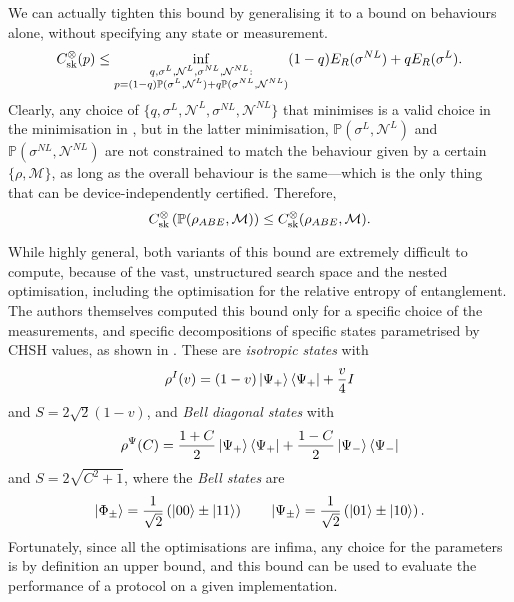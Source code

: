\documentclass[10pt, a4paper]{article}
\numberwithin{equation}{section} %
\theoremstyle{definition}
\theoremstyle{plain}
\newcommand{\?}{\mathrel{?}} %
\newcommand{\sM}{\mathcal{M}}
\newcommand{\sN}{\mathcal{N}}
\newcommand{\cP}{\mathbb{P}}
\newcommand{\sk}{\rm sk}
\begin{document}
      We can actually tighten this bound by generalising it to a bound on behaviours alone, without specifying any state or measurement.
      \begin{equation}\label{eqn:genubound_behav}
        C^{\otimes}_{\sk}(p) \leq \inf_{\substack{q, \sigma^{L}, \sN^{L}, \sigma^{NL}, \sN^{NL} : \\ p = (1-q)\cP(\sigma^{L}, \sN^{L}) + q\cP(\sigma^{NL}, \sN^{NL})}} (1-q) E_R(\sigma^{NL}) + q E_R(\sigma^L).
      \end{equation}
      Clearly, any choice of \(\{q, \sigma^{L}, \sN^{L}, \sigma^{NL}, \sN^{NL}\}\) that minimises  is a valid choice in the minimisation in , but in the latter minimisation, \(\cP(\sigma^{L}, \sN^{L})\) and \(\cP(\sigma^{NL}, \sN^{NL})\) are not constrained to match the behaviour given by a certain \(\{\rho, \sM\}\), as long as the overall behaviour is the same---which is the only thing that can be device-independently certified. Therefore,
      \begin{equation}
         C^{\otimes}_{\sk}\left( \cP(\rho_{ABE}, \sM) \right) \leq C^{\otimes}_{\sk}(\rho_{ABE}, \sM).
      \end{equation}

      While highly general, both variants of this bound are extremely difficult to compute, because of the vast, unstructured search space and the nested optimisation, including the optimisation for the relative entropy of entanglement. The authors themselves computed this bound only for a specific choice of the measurements, and specific decompositions of specific states parametrised by CHSH values, as shown in . These are \emph{isotropic states} with
      \begin{equation}
        \rho^{I}(v) = (1-v)\ket{\Psi_+}\bra{\Psi_+} + \frac{v}{4}I
      \end{equation}
      and \(S = 2\sqrt{2}(1-v)\), and \emph{Bell diagonal states} with
      \begin{equation}
        \rho^{\Psi}(C) = \frac{1+C}{2}\ket{\Psi_+}\bra{\Psi_+} + \frac{1-C}{2}\ket{\Psi_-}\bra{\Psi_-}
      \end{equation}
      and \(S = 2\sqrt{C^2+1}\), where the \emph{Bell states} are
      \begin{equation}
        \ket{\Phi_{\pm}} = \frac{1}{\sqrt{2}}\left( \ket{00} \pm \ket{11} \right) \qquad \ket{\Psi_{\pm}} = \frac{1}{\sqrt{2}}\left( \ket{01} \pm \ket{10} \right).
      \end{equation}
      Fortunately, since all the optimisations are infima, any choice for the parameters is by definition an upper bound, and this bound can be used to evaluate the performance of a protocol on a given implementation.
\end{document}
